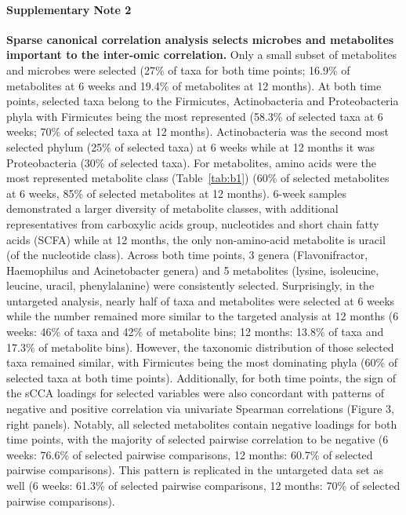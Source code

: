 \paragraph{Supplementary Note 2}
\label{appB_note2}
{\bf Sparse canonical correlation analysis selects microbes and metabolites important to the inter-omic correlation.} Only a small subset of metabolites and microbes were selected (27\% of taxa for both time points; 16.9\% of metabolites at 6 weeks and 19.4\% of metabolites at 12 months). At both time points, selected taxa belong to the Firmicutes, Actinobacteria and Proteobacteria phyla with Firmicutes being the most represented (58.3\% of selected taxa at 6 weeks; 70\% of selected taxa at 12 months). Actinobacteria was the second most selected phylum (25\% of selected taxa) at 6 weeks while at 12 months it was Proteobacteria (30\% of selected taxa). For metabolites, amino acids were the most represented metabolite class (Table~\ref{tab:b1}) (60\% of selected metabolites at 6 weeks, 85\% of selected metabolites at 12 months). 6-week samples demonstrated a larger diversity of metabolite classes, with additional representatives from carboxylic acids group, nucleotides and short chain fatty acids (SCFA) while at 12 months, the only non-amino-acid metabolite is uracil (of the nucleotide class). Across both time points, 3 genera (Flavonifractor, Haemophilus and Acinetobacter genera) and 5 metabolites (lysine, isoleucine, leucine, uracil, phenylalanine) were consistently selected. Surprisingly, in the untargeted analysis, nearly half of taxa and metabolites were selected at 6 weeks while the number remained more similar to the targeted analysis at 12 months (6 weeks: 46\% of taxa and 42\% of metabolite bins; 12 months: 13.8\% of taxa and  17.3\% of metabolite bins). However, the taxonomic distribution of those selected taxa remained similar, with Firmicutes being the most dominating phyla (60\% of selected taxa at both time points). Additionally, for both time points, the sign of the sCCA loadings for selected variables were also concordant with patterns of negative and positive correlation via univariate Spearman correlations (Figure 3, right panels). Notably, all selected metabolites contain negative loadings for both time points, with the majority of selected pairwise correlation to be negative (6 weeks: 76.6\% of selected pairwise comparisons, 12 months: 60.7\% of selected pairwise comparisons). This pattern is replicated in the untargeted data set as well (6 weeks: 61.3\% of selected pairwise comparisons, 12 months: 70\% of selected pairwise comparisons). 

